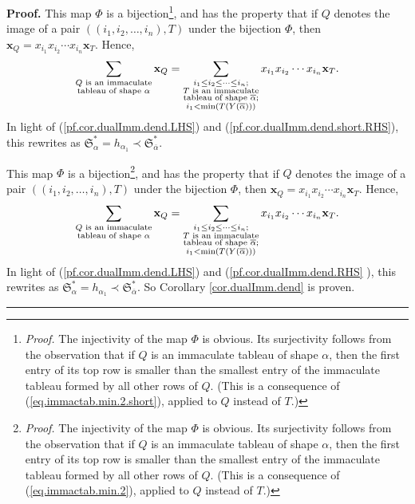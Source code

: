 \documentclass
[numbers=enddot,12pt,final,onecolumn,notitlepage,abstracton]{scrartcl}%
\theoremstyle{definition}
\newenvironment{proof}[1][Proof]{\noindent\textbf{#1.} }{\ \rule{0.5em}{0.5em}}
\newenvironment{verlong}{}{}
\newenvironment{vershort}{}{}
\let\sumnonlimits\sum
\renewcommand{\sum}{\sumnonlimits\limits}
\begin{document}
\begin{proof}
\begin{vershort}
This map $\Phi$ is a bijection\footnote{\textit{Proof.} The injectivity of the
map $\Phi$ is obvious. Its surjectivity follows from the observation that if
$Q$ is an immaculate tableau of shape $\alpha$, then the first entry of its
top row is smaller than the smallest entry of the immaculate tableau formed by
all other rows of $Q$. (This is a consequence of
(\ref{eq.immactab.min.2.short}), applied to $Q$ instead of $T$.)}, and has the
property that if $Q$ denotes the image of a pair $\left(  \left(  i_{1}%
,i_{2},\ldots,i_{n}\right)  ,T\right)  $ under the bijection $\Phi$, then
$\mathbf{x}_{Q}=x_{i_{1}}x_{i_{2}}\cdots x_{i_{n}}\mathbf{x}_{T}$. Hence,%
\[
\sum_{\substack{Q\text{ is an immaculate}\\\text{tableau of shape }\alpha
}}\mathbf{x}_{Q}=\sum\limits_{\substack{i_{1}\leq i_{2}\leq\cdots\leq
i_{n};\\T\text{ is an immaculate}\\\text{tableau of shape }\overline{\alpha
};\\i_{1}<\min\left(  T\left(  Y\left(  \overline{\alpha}\right)  \right)
\right)  }}x_{i_{1}}x_{i_{2}}\cdots x_{i_{n}}\mathbf{x}_{T}.
\]
In light of (\ref{pf.cor.dualImm.dend.LHS}) and
(\ref{pf.cor.dualImm.dend.short.RHS}), this rewrites as $\mathfrak{S}_{\alpha
}^{\ast}=h_{\alpha_{1}}\left.  \prec\right.  \mathfrak{S}_{\overline{\alpha}%
}^{\ast}$.
\end{vershort}

\begin{verlong}
This map $\Phi$ is a bijection\footnote{\textit{Proof.} The injectivity of the
map $\Phi$ is obvious. Its surjectivity follows from the observation that if
$Q$ is an immaculate tableau of shape $\alpha$, then the first entry of its
top row is smaller than the smallest entry of the immaculate tableau formed by
all other rows of $Q$. (This is a consequence of (\ref{eq.immactab.min.2}),
applied to $Q$ instead of $T$.)}, and has the property that if $Q$ denotes the
image of a pair $\left(  \left(  i_{1},i_{2},\ldots,i_{n}\right)  ,T\right)  $
under the bijection $\Phi$, then $\mathbf{x}_{Q}=x_{i_{1}}x_{i_{2}}\cdots
x_{i_{n}}\mathbf{x}_{T}$. Hence,%
\[
\sum_{\substack{Q\text{ is an immaculate}\\\text{tableau of shape }\alpha
}}\mathbf{x}_{Q}=\sum\limits_{\substack{i_{1}\leq i_{2}\leq\cdots\leq
i_{n};\\T\text{ is an immaculate}\\\text{tableau of shape }\overline{\alpha
};\\i_{1}<\min\left(  T\left(  Y\left(  \overline{\alpha}\right)  \right)
\right)  }}x_{i_{1}}x_{i_{2}}\cdots x_{i_{n}}\mathbf{x}_{T}.
\]
In light of (\ref{pf.cor.dualImm.dend.LHS}) and (\ref{pf.cor.dualImm.dend.RHS}%
), this rewrites as $\mathfrak{S}_{\alpha}^{\ast}=h_{\alpha_{1}}\left.
\prec\right.  \mathfrak{S}_{\overline{\alpha}}^{\ast}$. So Corollary
\ref{cor.dualImm.dend} is proven.
\end{verlong}
\end{proof}
\end{document}
